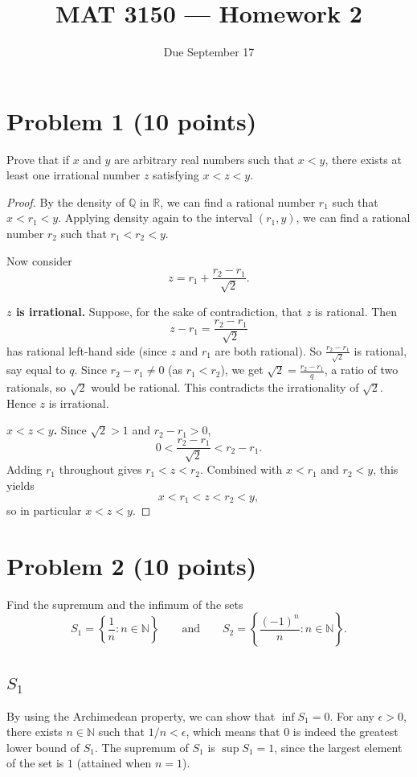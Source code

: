 \documentclass[11pt]{article}
\title{MAT 3150 --- Homework 2}
\author{}
\date{Due September 17}
\begin{document}
\maketitle

\section*{Problem 1 (10 points)}
Prove that if $x$ and $y$ are arbitrary real numbers such that $x<y$,
there exists at least one irrational number $z$ satisfying $x<z<y$.

\begin{proof}
By the density of $\mathbb{Q}$ in $\mathbb{R}$, we can find a rational number $r_1$ such that $x < r_1 < y$. Applying density again to the interval $(r_1, y)$, we can find a rational number $r_2$ such that $r_1 < r_2 < y$.

Now consider
\[
z = r_1 + \frac{r_2 - r_1}{\sqrt{2}}.
\]

\textbf{$z$ is irrational.} Suppose, for the sake of contradiction, that $z$ is rational. Then
\[
z - r_1 = \frac{r_2 - r_1}{\sqrt{2}}
\]
has rational left-hand side (since $z$ and $r_1$ are both rational). So $\frac{r_2-r_1}{\sqrt2}$ is rational, say equal to $q$. Since $r_2 - r_1 \neq 0$ (as $r_1 < r_2$), we get $\sqrt{2} = \frac{r_2-r_1}{q}$, a ratio of two rationals, so $\sqrt{2}$ would be rational. This contradicts the irrationality of $\sqrt{2}$. Hence $z$ is irrational.

\textbf{$x < z < y$.} Since $\sqrt{2} > 1$ and $r_2 - r_1 > 0$,
\[
0 < \frac{r_2 - r_1}{\sqrt{2}} < r_2 - r_1.
\]
Adding $r_1$ throughout gives $r_1 < z < r_2$. Combined with $x < r_1$ and $r_2 < y$, this yields
\[
x < r_1 < z < r_2 < y,
\]
so in particular $x < z < y$.

\end{proof}

\section*{Problem 2 (10 points)}
Find the supremum and the infimum of the sets
\[
  S_1 = \left\{ \frac{1}{n} : n \in \mathbb{N} \right\}
  \qquad \text{and} \qquad
  S_2 = \left\{ \frac{(-1)^n}{n} : n \in \mathbb{N} \right\}.
\]

\subsection*{$S_1$}
By using the Archimedean property, we can show that $\inf S_1 = 0$. For any $\epsilon > 0$, there exists $n \in \mathbb{N}$ such that $1/n < \epsilon$, which means that $0$ is indeed the greatest lower bound of $S_1$.
The supremum of $S_1$ is $\sup S_1 = 1$, since the largest element of the set is $1$ (attained when $n=1$).
\end{document}
